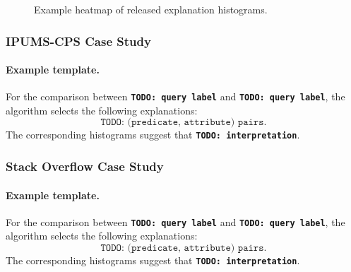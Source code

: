 
\begin{figure}[t]
    \centering
    \caption{Example heatmap of released explanation histograms.}
    \label{fig:case-study-heatmap}
\end{figure}

\subsubsection{IPUMS-CPS Case Study}
\label{subsubsec:ipums-case-study}


\paragraph{Example template.}
For the comparison between \textbf{\texttt{TODO: query label}} and
\textbf{\texttt{TODO: query label}}, the algorithm selects the following
explanations:
\[
    \texttt{TODO: (predicate, attribute) pairs}.
\]
The corresponding histograms suggest that \textbf{\texttt{TODO: interpretation}}.

\subsubsection{Stack Overflow Case Study}
\label{subsubsec:stackoverflow-case-study}


\paragraph{Example template.}
For the comparison between \textbf{\texttt{TODO: query label}} and
\textbf{\texttt{TODO: query label}}, the algorithm selects the following
explanations:
\[
    \texttt{TODO: (predicate, attribute) pairs}.
\]
The corresponding histograms suggest that \textbf{\texttt{TODO: interpretation}}.

